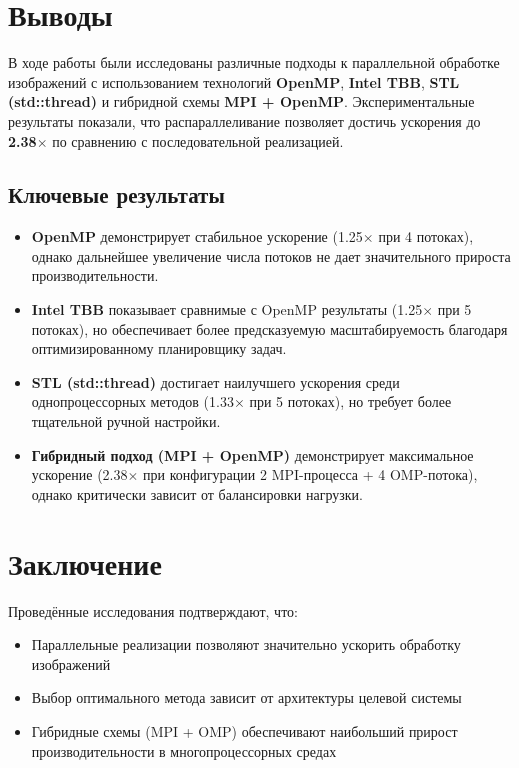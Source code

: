 \documentclass[a4paper,12pt]{article}
\begin{document}
\newpage

\section{Выводы}

В ходе работы были исследованы различные подходы к параллельной обработке изображений с использованием технологий \textbf{OpenMP}, \textbf{Intel TBB}, \textbf{STL (std::thread)} и гибридной схемы \textbf{MPI + OpenMP}. Экспериментальные результаты показали, что распараллеливание позволяет достичь ускорения до \textbf{2.38$\times$} по сравнению с последовательной реализацией.

\subsection{Ключевые результаты}
\begin{itemize}
    \item \textbf{OpenMP} демонстрирует стабильное ускорение (1.25$\times$ при 4 потоках), однако дальнейшее увеличение числа потоков не дает значительного прироста производительности.
    
    \item \textbf{Intel TBB} показывает сравнимые с OpenMP результаты (1.25$\times$ при 5 потоках), но обеспечивает более предсказуемую масштабируемость благодаря оптимизированному планировщику задач.
    
    \item \textbf{STL (std::thread)} достигает наилучшего ускорения среди однопроцессорных методов (1.33$\times$ при 5 потоках), но требует более тщательной ручной настройки.
    
    \item \textbf{Гибридный подход (MPI + OpenMP)} демонстрирует максимальное ускорение (2.38$\times$ при конфигурации 2 MPI-процесса + 4 OMP-потока), однако критически зависит от балансировки нагрузки.
\end{itemize}

\section{Заключение}
Проведённые исследования подтверждают, что:
\begin{itemize}
    \item Параллельные реализации позволяют значительно ускорить обработку изображений
    \item Выбор оптимального метода зависит от архитектуры целевой системы
    \item Гибридные схемы (MPI + OMP) обеспечивают наибольший прирост производительности в многопроцессорных средах
\end{itemize}
\end{document}
